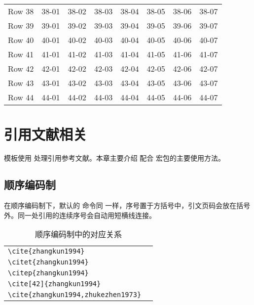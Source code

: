 \documentclass[report,oneside,UTF8,zihao=-4]{config}
\begin{document}
\begin{longtable}{cccccccc}
        Row 38 & 38-01 & 38-02 & 38-03 & 38-04 & 38-05 & 38-06 & 38-07 \\
        Row 39 & 39-01 & 39-02 & 39-03 & 39-04 & 39-05 & 39-06 & 39-07 \\
        Row 40 & 40-01 & 40-02 & 40-03 & 40-04 & 40-05 & 40-06 & 40-07 \\
        Row 41 & 41-01 & 41-02 & 41-03 & 41-04 & 41-05 & 41-06 & 41-07 \\
        Row 42 & 42-01 & 42-02 & 42-03 & 42-04 & 42-05 & 42-06 & 42-07 \\
        Row 43 & 43-01 & 43-02 & 43-03 & 43-04 & 43-05 & 43-06 & 43-07 \\
        Row 44 & 44-01 & 44-02 & 44-03 & 44-04 & 44-05 & 44-06 & 44-07 \\
\end{longtable}

\chapter{引用文献相关}

模板使用  处理引用参考文献。本章主要介绍  配合  宏包的主要使用方法\cite{zhangkun1994,zhukezhen1973,dupont1974bone,zhengkaiqing1987,jiangxizhou1980,jianduju1994,merkt1995rotational,mellinger1996laser,bixon1996dynamics,mahui1995,carlson1981two,taylor1983scanning,taylor1981study,shimizu1983laser,atkinson1982experimental,kusch1975perturbations,guangxi1993,huosini1989guwu,wangfuzhi1865songlun,zhaoyaodong1998xinshidai,biaozhunhua2002tushu,chubanzhuanye2004,who1970factors,peebles2001probability,baishunong1998zhiwu,weinstein1974pathogenic,hanjiren1985lun,dizhi1936dizhi,tushuguan1957tushuguanxue,aaas1883science,fugang2000fengsha,xiaoyu2001chubanye,oclc2000about,scitor2000project}。

\section{顺序编码制}

在顺序编码制下，默认的  命令同  一样，序号置于方括号中，引文页码会放在括号外。同一处引用的连续序号会自动用短横线连接。

\begin{table}[H]
  \centering
  \caption{顺序编码制中的对应关系}
      \begin{tabular}{l@{\quad$\Rightarrow$\quad}l}
      \verb|\cite{zhangkun1994}|               & \cite{zhangkun1994}               \\
      \verb|\citet{zhangkun1994}|              & \citet{zhangkun1994}              \\
      \verb|\citep{zhangkun1994}|              & \citep{zhangkun1994}              \\
      \verb|\cite[42]{zhangkun1994}|           & \cite[42]{zhangkun1994}           \\
      \verb|\cite{zhangkun1994,zhukezhen1973}| & \cite{zhangkun1994,zhukezhen1973} \\
      \end{tabular}
\end{table}
\end{document}
